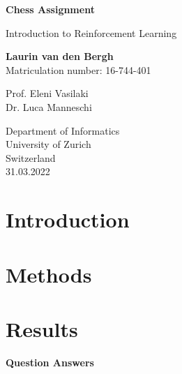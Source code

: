 \documentclass[11pt, a4paper, twocolumn]{article}
\begin{document}

\begin{titlepage}
    \begin{center}
        \vspace*{1cm}

        \textbf{Chess Assignment}

        \vspace{0.5cm}
        Introduction to Reinforcement Learning

        \vspace{1.5cm}

        \textbf{Laurin van den Bergh}\\
        Matriculation number: 16-744-401

        \vfill

        Prof. Eleni Vasilaki\\
        Dr. Luca Manneschi\\
        \vspace{0.8cm}

        Department of Informatics\\
        University of Zurich\\
        Switzerland\\
        31.03.2022

    \end{center}
\end{titlepage}




\section{Introduction}

\section{Methods}

\section{Results}


\textbf{Question Answers}
\end{document}
